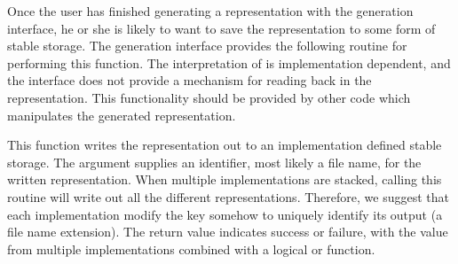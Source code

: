 \label{sec:storage}

Once the user has finished generating a representation with the
generation interface, he or she is likely to want to save the
representation to some form of stable storage.  The generation
interface provides the following routine for performing this function.
The interpretation of  is implementation dependent, and the
interface does not provide a mechanism for reading back in the
representation.  This functionality should be provided by other code
which manipulates the generated representation.  

\begin{functionality}
This function writes the representation out to an implementation
defined stable storage.  The  argument supplies an
identifier, most likely a file name, for the written representation.
When multiple implementations are stacked, calling this routine will
write out all the different representations.  Therefore, we suggest
that each implementation modify the key somehow to uniquely identify
its output (\eg a file name extension).  The return value indicates
success or failure, with the value from multiple implementations
combined with a logical or function.
\end{functionality}
